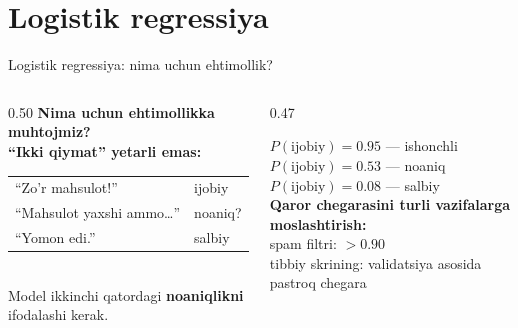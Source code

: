 \documentclass[aspectratio=169,11pt]{beamer}
\begin{document}
\section[Log.\ Reg.]{Logistik regressiya}

\begin{frame}{Logistik regressiya: nima uchun ehtimollik?}
  \begin{columns}[T]
    \begin{column}{0.50\textwidth}
      \small
       \textbf{Nima uchun ehtimollikka muhtojmiz?}\\[5pt]

      \textbf{``Ikki qiymat'' yetarli emas:}\\[5pt]
      \begin{tabular}{@{}p{4.5cm}l@{}}
        ``Zo'r mahsulot!'' & ijobiy \\[2pt]
        ``Mahsulot yaxshi ammo\ldots'' & noaniq? \\[2pt]
        ``Yomon edi.'' & salbiy \\
      \end{tabular}
      \vspace{6pt}\\
      Model ikkinchi qatordagi
      \textbf{noaniqlikni} ifodalashi kerak.
    \end{column}
    \begin{column}{0.47\textwidth}
      \begin{tcolorbox}[defbox,title=Ehtimollik beradi]
        \small
        $P(\text{ijobiy})=0.95$ --- ishonchli\\[2pt]
        $P(\text{ijobiy})=0.53$ --- noaniq\\[2pt]
        $P(\text{ijobiy})=0.08$ --- salbiy\\[4pt]
        \textbf{Qaror chegarasini turli vazifalarga moslashtirish:}\\
        spam filtri: $>\!0.90$\\
        tibbiy skrining: validatsiya asosida pastroq chegara
      \end{tcolorbox}
    \end{column}
  \end{columns}
\end{frame}
\end{document}
